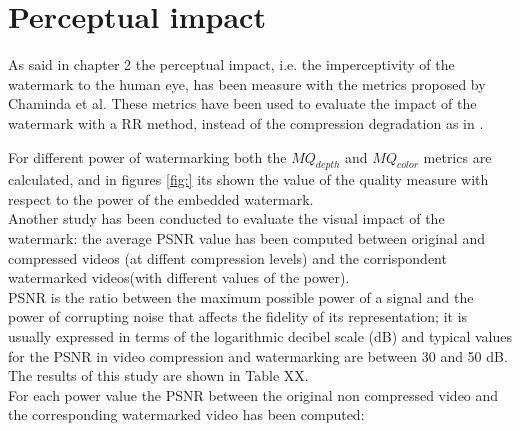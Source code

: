 \section{Perceptual impact}

As said in chapter 2 the perceptual impact, i.e. the imperceptivity of the watermark to the human eye, has been measure with the metrics proposed by Chaminda et al. These metrics have been used to evaluate the impact of the watermark with a RR method, instead of the compression degradation as in \cite{METRICS}.

For different power of watermarking both the $MQ_{depth}$ and $MQ_{color}$ metrics are calculated, and in figures \ref{fig:} its shown the value of the quality measure with respect to the power of the embedded watermark. \\



Another study has been conducted to evaluate the visual impact of the watermark: the average PSNR value has been computed between original and compressed videos (at diffent compression levels) and the corrispondent watermarked videos(with different values of the power).\\ 
PSNR is the ratio between the maximum possible power of a signal and the power of corrupting noise that affects the fidelity of its representation; it is usually expressed in terms of the logarithmic decibel scale (dB) and typical values for the PSNR in video compression and watermarking are between 30 and 50 dB.
The results of this study are shown in Table XX.\\
For each power value the PSNR between the original non compressed video and the corresponding watermarked video has been computed: 


